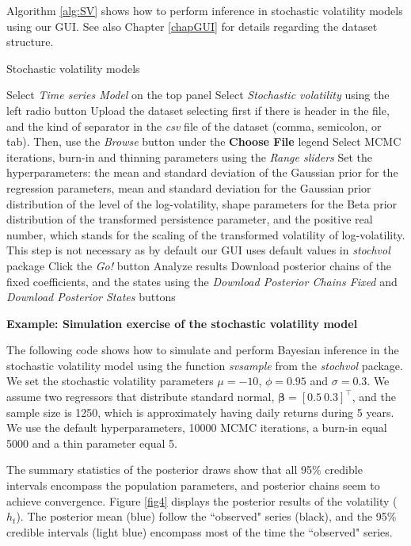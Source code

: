 Algorithm \ref{alg:SV} shows how to perform inference in stochastic volatility models using our GUI. See also Chapter \ref{chapGUI} for details regarding the dataset structure. 

\begin{algorithm}[h!]
	\caption{Stochastic volatility models}\label{alg:SV}
	\begin{algorithmic}[1]  		 			
		\State Select \textit{Time series Model} on the top panel
		\State Select \textit{Stochastic volatility} using the left radio button
		\State Upload the dataset selecting first if there is header in the file, and the kind of separator in the \textit{csv} file of the dataset (comma, semicolon, or tab). Then, use the \textit{Browse} button under the \textbf{Choose File} legend
		\State Select MCMC iterations, burn-in and thinning parameters using the \textit{Range sliders}
		\State Set the hyperparameters: the mean and standard deviation of the Gaussian prior for the regression parameters, mean and standard deviation for the Gaussian prior distribution of the level of the log-volatility, shape parameters for the Beta prior distribution of the transformed persistence parameter, and the positive real number, which stands for the scaling of the transformed volatility of log-volatility. This step is not necessary as by default our GUI uses default values in \textit{stochvol} package
		\State Click the \textit{Go!} button
		\State Analyze results
		\State Download posterior chains of the fixed coefficients, and the states using the \textit{Download Posterior Chains Fixed} and \textit{Download Posterior States} buttons
	\end{algorithmic} 
\end{algorithm}

\textbf{Example: Simulation exercise of the stochastic volatility model}

The following code shows how to simulate and perform Bayesian inference in the stochastic volatility model using the function \textit{svsample} from the \textit{stochvol} package. We set the stochastic volatility parameters $\mu=-10$, $\phi=0.95$ and $\sigma=0.3$. We assume two regressors that distribute standard normal, $\bm{\beta}=[0.5 \ 0.3]^{\top}$, and the sample size is 1250, which is approximately having daily returns during 5 years. We use the default hyperparameters, 10000 MCMC iterations, a burn-in equal 5000 and a thin parameter equal 5.

The summary statistics of the posterior draws show that all 95\% credible intervals encompass the population parameters, and posterior chains seem to achieve convergence. Figure \ref{fig4} displays the posterior results of the volatility ($h_t$). The posterior mean (blue) follow the ``observed" series (black), and the 95\% credible intervals (light blue) encompass most of the time the ``observed" series. 

